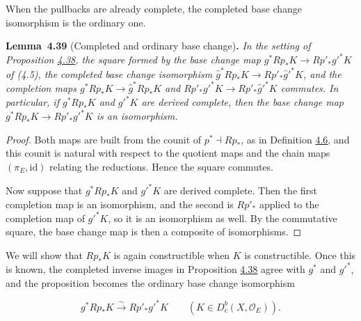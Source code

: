 \documentclass[11pt]{article}
\newenvironment{bpstatement}[2]{\par\addvspace{0.6\baselineskip}\noindent\textbf{#1}#2\textbf{.}\enspace\ignorespaces}
  {\par\addvspace{0.4\baselineskip}}
\newenvironment{bpstatementit}[2]{\begin{bpstatement}{#1}{#2}\itshape\ignorespaces}{\end{bpstatement}}
\providecommand{\Dbc}{}\renewcommand{\Dbc}{D^b_c}
\begin{document}
\label{bp399}%
When the pullbacks are already complete, the completed base change isomorphism is the ordinary one.

\label{bp400}%
\begin{bpstatementit}{Lemma~4.39}{ (Completed and ordinary base change)}
In the setting of Proposition \hyperref[bp397]{4.38}, the square formed by the base change map \(g^*Rp_*K\to Rp'_*g'^*K\) of (4.5), the completed base change isomorphism \(\hat g^*Rp_*K\to Rp'_*\hat g'^*K\), and the completion maps \(g^*Rp_*K\to\hat g^*Rp_*K\) and \(Rp'_*g'^*K\to Rp'_*\hat g'^*K\) commutes. In particular, if \(g^*Rp_*K\) and \(g'^*K\) are derived complete, then the base change map \(g^*Rp_*K\to Rp'_*g'^*K\) is an isomorphism.
\end{bpstatementit}

\begin{proof}[{Proof}]\label{bp401}%
Both maps are built from the counit of \(p^*\dashv Rp_*\), as in Definition \hyperref[bp302]{4.6}, and this counit is natural with respect to the quotient maps and the chain maps \((\pi_E,\mathrm{id})\) relating the reductions. Hence the square commutes.

Now suppose that \(g^*Rp_*K\) and \(g'^*K\) are derived complete. Then the first completion map is an isomorphism, and the second is \(Rp'_*\) applied to the completion map of \(g'^*K\), so it is an isomorphism as well. By the commutative square, the base change map is then a composite of isomorphisms.
\end{proof}

\label{bp402}%
We will show that \(Rp_*K\) is again constructible when \(K\) is constructible. Once this is known, the completed inverse images in Proposition \hyperref[bp397]{4.38} agree with \(g^*\) and \(g'^*\), and the proposition becomes the ordinary base change isomorphism

\[
g^*Rp_*K\xrightarrow{\sim}Rp'_*g'^*K
\qquad(K\in\Dbc(X,\mathcal O_E)).
\]


\end{document}

